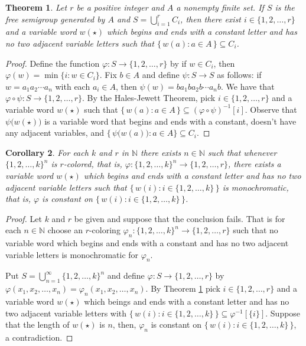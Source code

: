 \documentclass[12pt]{article}
\theoremstyle{plain}
\newtheorem{thm}{Theorem}[section]
\newtheorem{cor}[thm]{Corollary}
\theoremstyle{definition}
\newcommand{\bbN}{\mathbb{N}}
\begin{document}
\begin{thm}
  \label{thm:special-hj}
  Let $r$ be a positive integer and $A$ a nonempty finite set.
  If $S$ is the free semigroup generated by $A$ and $S = \bigcup_{i=1}^r C_i$, then there exist $i \in \{1, 2, \ldots, r\}$ and a variable word $w(\star)$ which begins and ends with a constant letter and has no two adjacent variable letters such that $\bigl\{\, w(a) : a \in A \,\bigr\} \subseteq C_i$.
\end{thm}
\begin{proof}
  Define the function $\varphi \colon S \to \{1, 2, \ldots, r\}$ by if $w \in C_i$, then $\varphi(w) = \min\{i : w \in C_i\}$. 
  Fix $b \in A$ and define $\psi \colon S \to S$ as follows: if $w = a_1a_2 \cdots a_n$ with each $a_i \in A$, then $\psi(w) = ba_1ba_2b\cdots a_nb$.
  We have that $\varphi \circ \psi \colon S \to \{1, 2, \ldots, r\}$.
  By the Hales-Jewett Theorem, pick $i \in \{1, 2, \ldots, r\}$ and a variable word $w(\star)$ such that $\{\, w(a) : a \in A \,\} \subseteq (\varphi \circ \psi)^{-1}[i]$.
  Observe that $\psi\bigl(w(\star)\bigr)$ is a variable word that begins and ends with a constant, doesn't have any adjacent variables, and $\{\, \psi\bigl(w(a)\bigr) : a \in A \} \subseteq C_i$.
\end{proof}

\begin{cor}
  For each $k$ and $r$ in $\bbN$ there exists $n \in \bbN$ such that whenever $\{1, 2, \ldots, k\}^n$ is $r$-colored, that is, $\varphi \colon \{1, 2, \ldots, k\}^n \to \{1, 2, \ldots, r\}$, there exists a variable word $w(\star)$ which begins and ends with a constant letter and has no two adjacent variable letters such that $\bigl\{\, w(i) : i \in \{1, 2, \ldots, k\} \,\bigr\}$ is monochromatic, that is, $\varphi$ is constant on $\bigl\{\, w(i) : i \in \{1, 2, \ldots, k\} \,\bigr\}$.
\end{cor}
\begin{proof}
  Let $k$ and $r$ be given and suppose that the conclusion fails.
  That is for each $n \in \bbN$ choose an $r$-coloring $\varphi_n \colon \{1, 2, \ldots, k\}^n \to \{1, 2, \ldots, r\}$ such that no variable word which begins and ends with a constant and has no two adjacent variable letters is monochromatic for $\varphi_n$.
  
  Put $S = \bigcup_{n=1}^\infty \{1, 2, \ldots, k\}^n$ and define $\varphi \colon S \to \{1, 2, \ldots, r\}$ by $\varphi(x_1, x_2, \ldots, x_n) = \varphi_n(x_1, x_2, \ldots, x_n)$.
  By Theorem \ref{thm:special-hj} pick $i \in \{1, 2, \ldots, r\}$ and a variable word $w(\star)$ which beings and ends with a constant letter and has no two adjacent variable letters with $\bigl\{\, w(i) : i \in \{1, 2, \ldots, k\} \,\bigr\} \subseteq \varphi^{-1}[\{i\}]$.
  Suppose that the length of $w(\star)$ is $n$, then, $\varphi_n$ is constant on $\bigl\{\, w(i) : i \in \{1, 2, \ldots, k\} \,\bigr\}$, a contradiction. 
\end{proof}
\end{document}

